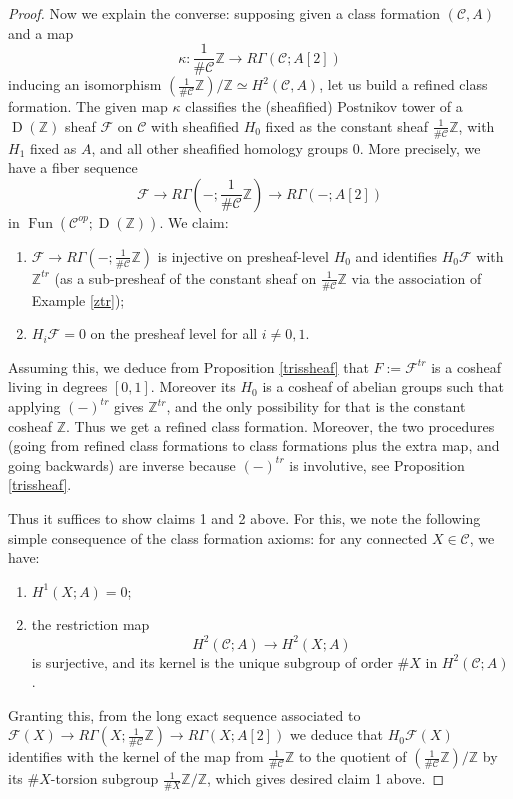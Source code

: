 \documentclass[12pt]{article}
\theoremstyle{definition}
\newcommand{\on}{\operatorname}
\newcommand{\mc}{\mathcal}
\newcommand{\mbb}{\mathbb}
\begin{document}
\begin{proof}
Now we explain the converse: supposing given a class formation $(\mc{C},A)$ and a map 
$$\kappa:\frac{1}{\#\mc{C}}\mbb{Z} \to R\Gamma(\mc{C};A[2])$$
inducing an isomorphism $\left(\frac{1}{\#\mc{C}}\mbb{Z}\right)/\mbb{Z}\simeq H^2(\mc{C},A)$, let us build a refined class formation.  The given map $\kappa$ classifies the (sheafified) Postnikov tower of a $\on{D}(\mbb{Z})$ sheaf $\mc{F}$ on $\mc{C}$ with sheafified $H_0$ fixed as the constant sheaf $\frac{1}{\#\mc{C}}\mbb{Z}$, with $H_1$ fixed as $A$, and all other sheafified homology groups $0$.  More precisely, we have a fiber sequence
$$\mc{F} \to R\Gamma(-;\frac{1}{\#\mc{C}}\mbb{Z}) \to R\Gamma(-;A[2])$$
in $\on{Fun}(\mc{C}^{op};\on{D}(\mbb{Z}))$.  We claim:
\begin{enumerate}
\item $\mc{F} \to R\Gamma(-;\frac{1}{\#\mc{C}}\mbb{Z})$ is injective on presheaf-level $H_0$ and identifies $H_0\mc{F}$ with $\mbb{Z}^{tr}$ (as a sub-presheaf of the constant sheaf on $\frac{1}{\#\mc{C}}\mbb{Z}$ via the association of Example \ref{ztr});
\item $H_i\mc{F}=0$ on the presheaf level for all $i\neq 0,1$.
\end{enumerate}
Assuming this, we deduce from Proposition \ref{trissheaf} that $F:=\mc{F}^{tr}$ is a cosheaf living in degrees $[0,1]$.  Moreover its $H_0$ is a cosheaf of abelian groups such that applying $(-)^{tr}$ gives $\mbb{Z}^{tr}$, and the only possibility for that is the constant cosheaf $\mbb{Z}$.  Thus we get a refined class formation.  Moreover, the two procedures (going from refined class formations to class formations plus the extra map, and going backwards) are inverse because $(-)^{tr}$ is involutive, see Proposition \ref{trissheaf}.

Thus it suffices to show claims 1 and 2 above.  For this, we note the following simple consequence of the class formation axioms: for any connected $X\in\mc{C}$, we have:
\begin{enumerate}
\item $H^1(X;A)=0$;
\item the restriction map
$$H^2(\mc{C};A)\to H^2(X;A)$$
is surjective, and its kernel is the unique subgroup of order $\#X$ in $H^2(\mc{C};A)$.
\end{enumerate}
Granting this, from the long exact sequence associated to $\mc{F}(X) \to R\Gamma(X;\frac{1}{\#\mc{C}}\mbb{Z}) \to R\Gamma(X;A[2])$ we deduce that $H_0\mc{F}(X)$ identifies with the kernel of the map from $\frac{1}{\#\mc{C}}\mbb{Z}$ to the quotient of $\left(\frac{1}{\#\mc{C}}\mbb{Z}\right)/\mbb{Z}$ by its $\# X$-torsion subgroup $\frac{1}{\#X}\mbb{Z}/\mbb{Z}$, which gives desired claim 1 above.


\end{proof}
\end{document}
